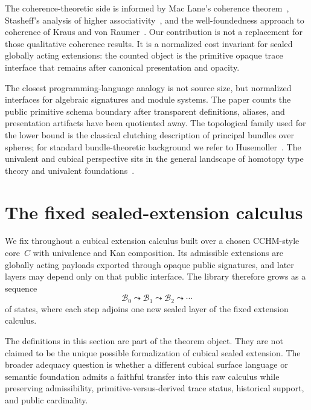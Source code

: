 \documentclass{lmcs}
\newcommand{\B}{\mathcal{B}}
\begin{document}
The coherence-theoretic side is informed by Mac Lane's coherence
theorem~\cite{maclane-coherence}, Stasheff's analysis of higher
associativity~\cite{stasheff}, and the well-foundedness approach to coherence of
Kraus and von Raumer~\cite{kraus-vonraumer}. Our contribution is not a replacement
for those qualitative coherence results. It is a normalized cost invariant for
sealed globally acting extensions: the counted object is the primitive opaque
trace interface that remains after canonical presentation and opacity.

The closest programming-language analogy is not source size, but normalized
interfaces for algebraic signatures and module systems. The paper counts the
public primitive schema boundary after transparent definitions, aliases, and
presentation artifacts have been quotiented away. The topological family used for
the lower bound is the classical clutching description of principal bundles over
spheres; for standard bundle-theoretic background we refer to
Husemoller~\cite{husemoller}. The univalent and cubical perspective sits in the
general landscape of homotopy type theory and univalent foundations~\cite{hott}.

\section{The fixed sealed-extension calculus}
\label{sec:framework}

We fix throughout a cubical extension calculus built over a chosen CCHM-style core~$C$ with univalence and Kan composition. Its admissible extensions are globally acting payloads exported through opaque public signatures, and later layers may depend only on that public interface. The library therefore grows as a sequence
\[
  \B_0 \leadsto \B_1 \leadsto \B_2 \leadsto \cdots
\]
of states, where each step adjoins one new sealed layer of the fixed extension calculus.

The definitions in this section are part of the theorem object. They are not claimed to be the unique possible formalization of cubical sealed extension. The broader adequacy question is whether a different cubical surface language or semantic foundation admits a faithful transfer into this raw calculus while preserving admissibility, primitive-versus-derived trace status, historical support, and public cardinality.
\end{document}
